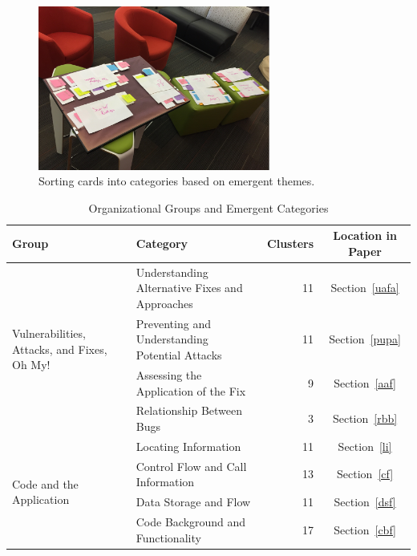 \documentclass[conference]{IEEEtran}
\begin{document}
\begin{figure}
\centering
\includegraphics[width=3in]{Images/categories.pdf}
\caption{Sorting cards into categories based on emergent themes.}
\label{fig:cardsort} 
\end{figure}


\begin{table} 
\centering
\caption{Organizational Groups and Emergent Categories}
\begin{tabular}{|l|l|r|c|}
\rowcolor{gray!50}
\hline
    Group											& Category										& Clusters		& Location in Paper	  	\\
    \hline			
    \multirow{4}{*}{Vulnerabilities, Attacks, and Fixes, Oh My!}
        											& Understanding Alternative Fixes and Approaches	& 11     		& Section~\ref{uafa}	\\

    												& Preventing and Understanding Potential Attacks	& 11     		& Section~\ref{pupa}		\\

    												& Assessing the Application of the Fix				& 9     		& Section~\ref{aaf}				\\

    												& Relationship Between Bugs							& 3     		& Section~\ref{rbb}			\\
    \hline
    \multirow{4}{*}{Code and the Application}	
    												& Locating Information 								& 11      		& Section~\ref{li}		\\

    												& Control Flow and Call Information					& 13     		& Section~\ref{cf}	\\

    												& Data Storage and Flow								& 11     		& Section~\ref{dsf}  	\\

    												& Code Background and Functionality	 				& 17     		& Section~\ref{cbf}			\\


\end{tabular}
\end{table}
\end{document}
